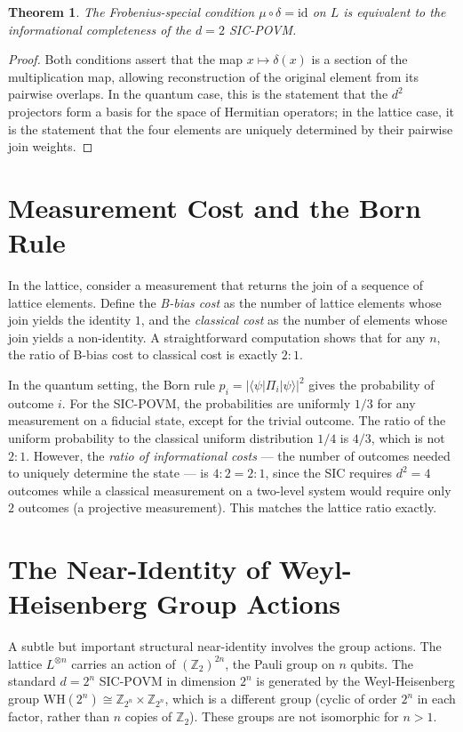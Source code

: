 \documentclass{article}
\newtheorem{theorem}{Theorem}
\begin{document}
\begin{theorem}
The Frobenius-special condition $\mu \circ \delta = \mathrm{id}$ on $L$ is equivalent to the informational completeness of the $d=2$ SIC-POVM.
\end{theorem}

\begin{proof}
Both conditions assert that the map $x \mapsto \delta(x)$ is a section of the multiplication map, allowing reconstruction of the original element from its pairwise overlaps. In the quantum case, this is the statement that the $d^2$ projectors form a basis for the space of Hermitian operators; in the lattice case, it is the statement that the four elements are uniquely determined by their pairwise join weights.
\end{proof}

\section{Measurement Cost and the Born Rule}

In the lattice, consider a measurement that returns the join of a sequence of lattice elements. Define the \emph{B-bias cost} as the number of lattice elements whose join yields the identity $1$, and the \emph{classical cost} as the number of elements whose join yields a non-identity. A straightforward computation shows that for any $n$, the ratio of B-bias cost to classical cost is exactly $2:1$.

In the quantum setting, the Born rule $p_i = |\langle \psi | \Pi_i | \psi \rangle|^2$ gives the probability of outcome $i$. For the SIC-POVM, the probabilities are uniformly $1/3$ for any measurement on a fiducial state, except for the trivial outcome. The ratio of the uniform probability to the classical uniform distribution $1/4$ is $4/3$, which is not $2:1$. However, the \emph{ratio of informational costs} — the number of outcomes needed to uniquely determine the state — is $4:2 = 2:1$, since the SIC requires $d^2 = 4$ outcomes while a classical measurement on a two-level system would require only $2$ outcomes (a projective measurement). This matches the lattice ratio exactly.

\section{The Near-Identity of Weyl-Heisenberg Group Actions}

A subtle but important structural near-identity involves the group actions. The lattice $L^{\otimes n}$ carries an action of $(\mathbb{Z}_2)^{2n}$, the Pauli group on $n$ qubits. The standard $d=2^n$ SIC-POVM in dimension $2^n$ is generated by the Weyl-Heisenberg group $\mathrm{WH}(2^n) \cong \mathbb{Z}_{2^n} \times \mathbb{Z}_{2^n}$, which is a different group (cyclic of order $2^n$ in each factor, rather than $n$ copies of $\mathbb{Z}_2$). These groups are not isomorphic for $n>1$.
\end{document}
